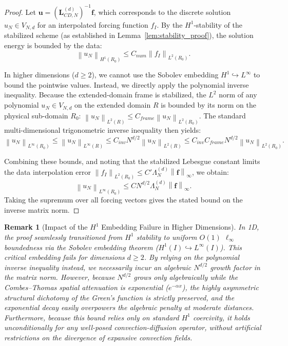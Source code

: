 \documentclass[pdflatex,sn-mathphys-num]{sn-jnl}%
\theoremstyle{thmstyleone}%
\newtheorem{remark}{Remark}
\newcommand{\norm}[1]{\left\lVert#1\right\rVert}
\newcommand{\mat}[1]{\mathbf{#1}}
\newcommand{\vect}[1]{\mathbf{#1}}
\begin{document}
\begin{proof}
Let $\vect{u} = (\mat{L}_{CD,N}^{(d)})^{-1} \vect{f}$, which corresponds to the discrete solution $u_N \in V_{N,d}$ for an interpolated forcing function $f_I$. By the $H^1$-stability of the stabilized scheme (as established in Lemma~\ref{lem:stability_proof}), the solution energy is bounded by the data:
\begin{equation}
\norm{u_N}_{H^1(R_0)} \le C_{num} \norm{f_I}_{L^2(R_0)}.
\end{equation}

In higher dimensions ($d \ge 2$), we cannot use the Sobolev embedding $H^1 \hookrightarrow L^\infty$ to bound the pointwise values. Instead, we directly apply the polynomial inverse inequality. Because the extended-domain frame is stabilized, the $L^2$ norm of any polynomial $u_N \in V_{N,d}$ on the extended domain $R$ is bounded by its norm on the physical sub-domain $R_0$: $\norm{u_N}_{L^2(R)} \le C_{frame} \norm{u_N}_{L^2(R_0)}$. The standard multi-dimensional trigonometric inverse inequality then yields:
\begin{equation} \norm{u_N}_{L^\infty(R_0)} \le \norm{u_N}_{L^\infty(R)} \le C_{inv} N^{d/2} \norm{u_N}_{L^2(R)} \le C_{inv} C_{frame} N^{d/2} \norm{u_N}_{L^2(R_0)}. \end{equation}

Combining these bounds, and noting that the stabilized Lebesgue constant limits the data interpolation error $\norm{f_I}_{L^2(R_0)} \le C' \Lambda_N^{(d)} \norm{\vect{f}}_\infty$, we obtain:
\begin{equation} \norm{u_N}_{L^\infty(R_0)} \le C N^{d/2} \Lambda_N^{(d)} \norm{\vect{f}}_\infty. \end{equation}
Taking the supremum over all forcing vectors gives the stated bound on the inverse matrix norm.
\end{proof}

\begin{remark}[Impact of the $H^1$ Embedding Failure in Higher Dimensions]
In 1D, the proof seamlessly transitioned from $H^1$ stability to uniform $O(1)$ $\ell_\infty$ boundedness via the Sobolev embedding theorem ($H^1(I) \hookrightarrow L^\infty(I)$). This critical embedding fails for dimensions $d \ge 2$. By relying on the polynomial inverse inequality instead, we necessarily incur an algebraic $N^{d/2}$ growth factor in the matrix norm. However, because $N^{d/2}$ grows only algebraically while the Combes--Thomas spatial attenuation is exponential ($e^{-\alpha x}$), the highly asymmetric structural dichotomy of the Green's function is strictly preserved, and the exponential decay easily overpowers the algebraic penalty at moderate distances. Furthermore, because this bound relies only on standard $H^1$ coercivity, it holds unconditionally for any well-posed convection-diffusion operator, without artificial restrictions on the divergence of expansive convection fields.
\end{remark}
\end{document}
